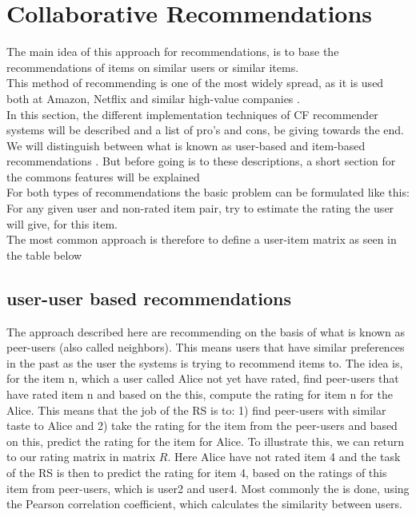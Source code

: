 \section{Collaborative Recommendations}
\label{sec:collaborative}
The main idea of this approach for recommendations, is to base the recommendations of items on similar users or similar items.\\
This method of recommending is one of the most widely spread, as it is used both at Amazon, Netflix and similar high-value companies .\\
In this section, the different implementation techniques of CF recommender systems will be described and a list of pro's and cons, be giving towards the end. We will distinguish between what is known as user-based and item-based recommendations . But before going is to these descriptions, a short section for the commons features will be explained\\

For both types of recommendations the basic problem can be formulated like this: For any given user and non-rated item pair, try to estimate the rating the user will give, for this item.\\
The most common approach is therefore to define a user-item matrix as seen in the table below 


\subsection{user-user based recommendations} %
\label{sub:user_user_based_recommendations}
The approach described here are recommending on the basis of what is known as peer-users (also called neighbors). This means users that have similar preferences in the past as the user the systems is trying to recommend items to. The idea is, for the item n, which a user called Alice not yet have rated, find peer-users that have rated item n and based on the this, compute the rating for item n for the Alice. This means that the job of the RS is to: 1) find peer-users with similar taste to Alice and 2) take the rating for the item from the peer-users and based on this, predict the rating for the item for Alice.
To illustrate this, we can return to our rating matrix in matrix \(R\). Here Alice have not rated item 4 and the task of the RS is then to predict the rating for item 4, based on the ratings of this item from peer-users, which is user2 and user4. Most commonly the is done, using the Pearson correlation coefficient, which calculates the similarity between users.

